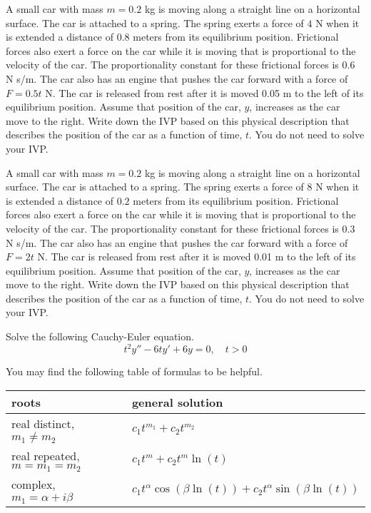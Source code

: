 \ifnum {}
\question[2] A small car with mass $m = 0.2$ kg is moving along a straight line on a horizontal surface. The car is attached to a spring. The spring exerts a force of $4$ N when it is extended a distance of $0.8$ meters from its equilibrium position. Frictional forces also exert a force on the car while it is moving that is proportional to the velocity of the car. The proportionality constant for these frictional forces is $0.6$ N s/m. The car also has an engine that pushes the car forward with a force of $F = 0.5t$ N. The car is released from rest after it is moved 0.05 m to the left of its equilibrium position. Assume that position of the car, $y$, increases as the car move to the right. Write down the IVP based on this physical description that describes the position of the car as a function of time, $t$. You do not need to solve your IVP. \\

\fi 


\ifnum {}
\question[2] A small car with mass $m = 0.2$ kg is moving along a straight line on a horizontal surface. The car is attached to a spring. The spring exerts a force of $8$ N when it is extended a distance of $0.2$ meters from its equilibrium position. Frictional forces also exert a force on the car while it is moving that is proportional to the velocity of the car. The proportionality constant for these frictional forces is $0.3$ N s/m. The car also has an engine that pushes the car forward with a force of $F = 2t$ N. The car is released from rest after it is moved 0.01 m to the left of its equilibrium position. Assume that position of the car, $y$, increases as the car move to the right. Write down the IVP based on this physical description that describes the position of the car as a function of time, $t$. You do not need to solve your IVP. \\

\fi 



\ifnum {}

\question[6] Solve the following Cauchy-Euler equation. 
$$t^2y'' - 6ty' + 6y = 0, \quad t > 0$$

You may find the following table of formulas to be helpful. 

\begin{center}
    \begin{tabular}{ p{6.2cm} p{6cm} }
        roots &  general solution 
        \\[2pt] \hline 
        real distinct, $m_1 \ne m_2$ &  $c_1 t^{m_1} + c_2 t^{m_2}$\\       
        real repeated, $m = m_1 = m_2$ & $c_1 t^{m} + c_2 t^m \ln(t)$\\
        complex, $m_1 = \alpha + i \beta$ & $c_1t^{\alpha}\cos(\beta \ln(t)) + c_2t^{\alpha}\sin(\beta \ln (t))$\\[2pt] \hline
    \end{tabular}    
\end{center}


